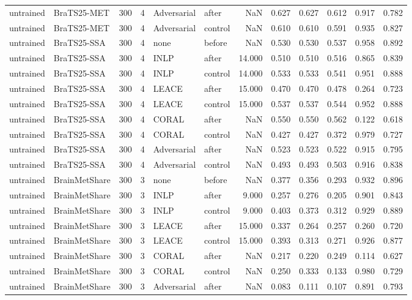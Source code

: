 \begin{tabular}{llrrllrrrrrr}
untrained & BraTS25-MET & 300 & 4 & Adversarial & after & NaN & 0.627 & 0.627 & 0.612 & 0.917 & 0.782 \\
untrained & BraTS25-MET & 300 & 4 & Adversarial & control & NaN & 0.610 & 0.610 & 0.591 & 0.935 & 0.827 \\
untrained & BraTS25-SSA & 300 & 4 & none & before & NaN & 0.530 & 0.530 & 0.537 & 0.958 & 0.892 \\
untrained & BraTS25-SSA & 300 & 4 & INLP & after & 14.000 & 0.510 & 0.510 & 0.516 & 0.865 & 0.839 \\
untrained & BraTS25-SSA & 300 & 4 & INLP & control & 14.000 & 0.533 & 0.533 & 0.541 & 0.951 & 0.888 \\
untrained & BraTS25-SSA & 300 & 4 & LEACE & after & 15.000 & 0.470 & 0.470 & 0.478 & 0.264 & 0.723 \\
untrained & BraTS25-SSA & 300 & 4 & LEACE & control & 15.000 & 0.537 & 0.537 & 0.544 & 0.952 & 0.888 \\
untrained & BraTS25-SSA & 300 & 4 & CORAL & after & NaN & 0.550 & 0.550 & 0.562 & 0.122 & 0.618 \\
untrained & BraTS25-SSA & 300 & 4 & CORAL & control & NaN & 0.427 & 0.427 & 0.372 & 0.979 & 0.727 \\
untrained & BraTS25-SSA & 300 & 4 & Adversarial & after & NaN & 0.523 & 0.523 & 0.522 & 0.915 & 0.795 \\
untrained & BraTS25-SSA & 300 & 4 & Adversarial & control & NaN & 0.493 & 0.493 & 0.503 & 0.916 & 0.838 \\
untrained & BrainMetShare & 300 & 3 & none & before & NaN & 0.377 & 0.356 & 0.293 & 0.932 & 0.896 \\
untrained & BrainMetShare & 300 & 3 & INLP & after & 9.000 & 0.257 & 0.276 & 0.205 & 0.901 & 0.843 \\
untrained & BrainMetShare & 300 & 3 & INLP & control & 9.000 & 0.403 & 0.373 & 0.312 & 0.929 & 0.889 \\
untrained & BrainMetShare & 300 & 3 & LEACE & after & 15.000 & 0.337 & 0.264 & 0.257 & 0.260 & 0.720 \\
untrained & BrainMetShare & 300 & 3 & LEACE & control & 15.000 & 0.393 & 0.313 & 0.271 & 0.926 & 0.877 \\
untrained & BrainMetShare & 300 & 3 & CORAL & after & NaN & 0.217 & 0.220 & 0.249 & 0.114 & 0.627 \\
untrained & BrainMetShare & 300 & 3 & CORAL & control & NaN & 0.250 & 0.333 & 0.133 & 0.980 & 0.729 \\
untrained & BrainMetShare & 300 & 3 & Adversarial & after & NaN & 0.083 & 0.111 & 0.107 & 0.891 & 0.793 \\

\end{tabular}
